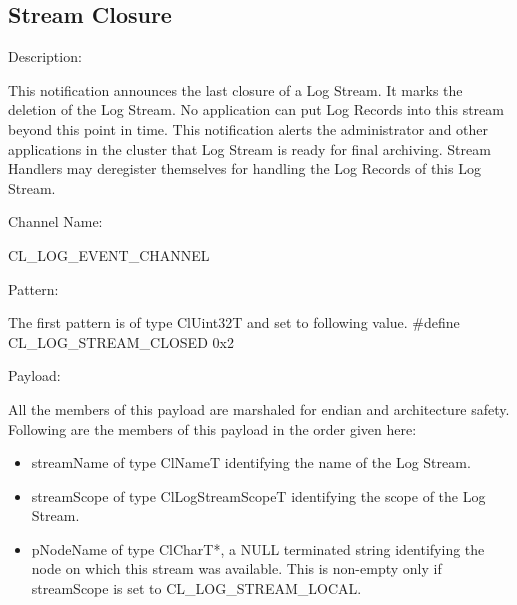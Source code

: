 \begin{flushleft}
\subsection{Stream Closure}
\begin{Desc}
\item[Description:]\end{Desc}
This notification announces the last closure of a Log Stream. It marks the deletion of the Log Stream. No application can put Log Records into this 
stream beyond this point in time. This notification alerts the administrator and other applications in the cluster that Log Stream is ready for final 
archiving. Stream Handlers may deregister themselves for handling the Log Records of this Log Stream.\begin{Desc}
\item[Channel Name:]\end{Desc}
CL\_\-LOG\_\-EVENT\_\-CHANNEL
\begin{Desc}
\item[Pattern:]\end{Desc}
The first pattern is of type ClUint32T and set to following value.
\#define CL\_\-LOG\_\-STREAM\_\-CLOSED	0x2
\begin{Desc}
\item[Payload:]\end{Desc}
All the members of this payload are marshaled for endian and architecture safety. Following are the members of this payload in the order given here:
\begin{itemize}
\item
streamName of type ClNameT identifying the name of the Log Stream.
\item
streamScope of type ClLogStreamScopeT identifying the scope of the Log Stream.
\item
pNodeName of type ClCharT*, a NULL terminated string identifying the node on which this stream was available. This is non-empty only if
streamScope is set to CL\_\-LOG\_\-STREAM\_\-LOCAL.
\end{itemize}





\end{flushleft}
